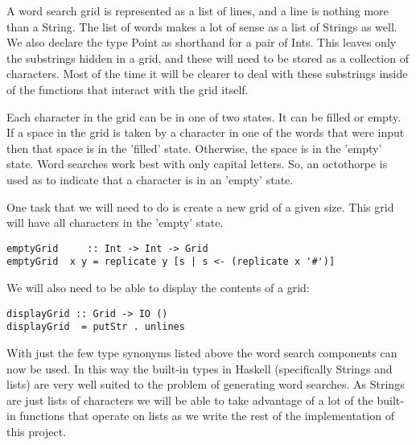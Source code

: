 \documentclass[12pt]{report}   %
\begin{document}
    \vspace{12pt}

    A word search grid is represented as a list of lines, and a line is 
    nothing more than a String. The list of words makes a lot of sense as a 
    list of Strings as well. We also declare the type Point as shorthand for
    a pair of Ints. This leaves only the substrings hidden in a grid, and these
    will need to be stored as a collection of characters. Most of the time it
    will be clearer to deal with these substrings inside of the functions
    that interact with the grid itself.

    \vspace{12pt}

    Each character in the grid can be in one of two states. It can be filled or
    empty. If a space in the grid is taken by a character in one of the words
    that were input then that space is in the 'filled' state. Otherwise, the
    space is in the 'empty' state. Word searches work best with only capital
    letters. So, an octothorpe is used as to indicate that a character is in
    an 'empty' state.

    \vspace{12pt}

    One task that we will need to do is create a new grid of a given size. This
    grid will have all characters in the 'empty' state.

    \vspace{12pt}

    \begin{lstlisting}
emptyGrid     :: Int -> Int -> Grid
emptyGrid  x y = replicate y [s | s <- (replicate x '#')] 
    \end{lstlisting}

    \vspace{12pt}

    We will also need to be able to display the contents of a grid:

    \vspace{12pt}

    \begin{lstlisting}
displayGrid :: Grid -> IO ()
displayGrid  = putStr . unlines
    \end{lstlisting}

    \vspace{12pt}

    With just the few type synonyms listed above the word search components can
    now be used. In this way the built-in types in Haskell (specifically
    Strings and lists) are very well suited to the problem of generating word
    searches. As Strings are just lists of characters we will be able to take
    advantage of a lot of the built-in functions that operate on lists as we
    write the rest of the implementation of this project.
\end{document}
